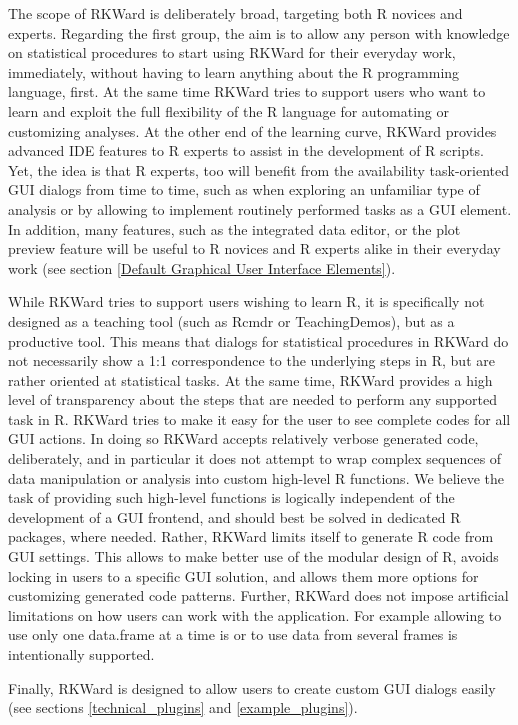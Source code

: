 \documentclass[article,shortnames]{jss}
\begin{document}
The scope of RKWard is deliberately broad, targeting both R novices and experts.
Regarding the first group, the aim is to allow any person with knowledge on
statistical procedures to start using RKWard for their everyday work,
immediately, without having to learn anything about the R programming language,
first. At the same time RKWard tries to support users who want to learn and
exploit the full flexibility of the R language for automating or customizing
analyses. At the other end of the learning curve, RKWard provides advanced IDE
features to R experts to assist in the development of R scripts. Yet, the idea
is that R experts, too will benefit from the availability task-oriented GUI
dialogs from time to time, such as when exploring an unfamiliar type of analysis
or by allowing to implement routinely performed tasks as a GUI element. In
addition, many features, such as the integrated data editor, or the plot preview
feature will be useful to R novices and R experts alike in their everyday work
(see section \ref{Default Graphical User Interface Elements}).

While RKWard tries to support users wishing to learn R, it is specifically not
designed as a teaching tool (such as Rcmdr or TeachingDemos), but as a
productive tool. This means that dialogs for statistical procedures in RKWard do
not necessarily show a 1:1 correspondence to the underlying steps in R, but are
rather oriented at statistical tasks. At the same time, RKWard provides a high
level of transparency about the steps that are needed to perform any supported
task in R. RKWard tries to make it easy for the user to see complete codes for
all GUI actions. In doing so RKWard accepts relatively verbose generated code,
deliberately, and in particular it does not attempt to wrap complex sequences of
data manipulation or analysis into custom high-level R functions. We believe the
task of providing such high-level functions is logically independent of the
development of a GUI frontend, and should best be solved in dedicated R
packages, where needed. Rather, RKWard limits itself to generate R code from GUI
settings. This allows to make better use of the modular design of R, avoids
locking in users to a specific GUI solution, and allows them more options for
customizing generated code patterns. Further, RKWard does not impose artificial
limitations on how users can work with the application. For example allowing to
use only one data.frame at a time is or to use data from several frames is
intentionally supported.

Finally, RKWard is designed to allow users to create custom GUI dialogs easily
(see sections \ref{technical_plugins} and \ref{example_plugins}).
\end{document}
